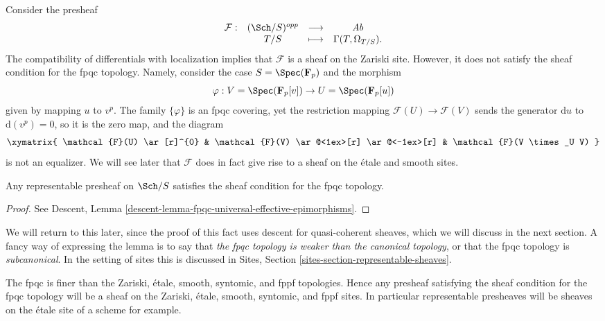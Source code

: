\begin{example}
\label{example-quasi-coherent}
Consider the presheaf
$$
\begin{matrix}
\mathcal{F} : & (\Sch/S)^{opp} & \longrightarrow & \textit{Ab} \\
& T/S & \longmapsto & \Gamma(T, \Omega_{T/S}).
\end{matrix}
$$
The compatibility of differentials with localization implies that
$\mathcal{F}$ is a sheaf on the Zariski site.
However, it does not satisfy the sheaf condition for the fpqc topology.
Namely, consider the case
$S = \Spec(\mathbf{F}_p)$ and the morphism
$$
\varphi :
V = \Spec(\mathbf{F}_p[v])
\to
U = \Spec(\mathbf{F}_p[u])
$$
given by mapping $u$ to $v^p$. The family $\{\varphi\}$ is an fpqc covering,
yet the restriction mapping
$\mathcal{F}(U) \to \mathcal{F}(V)$
sends the generator $\text{d}u$ to $\text{d}(v^p) = 0$, so
it is the zero map, and the diagram
$$
\xymatrix{
\mathcal{F}(U) \ar[r]^{0} &
\mathcal{F}(V) \ar@<1ex>[r] \ar@<-1ex>[r] &
\mathcal{F}(V \times_U V)
}
$$
is not an equalizer. We will see later that $\mathcal{F}$ does in fact
give rise to a sheaf on the \'etale and smooth sites.
\end{example}

\begin{lemma}
\label{lemma-representable-sheaf-fpqc}
Any representable presheaf on $\Sch/S$ satisfies the
sheaf condition for the fpqc topology.
\end{lemma}

\begin{proof}
See
Descent, Lemma \ref{descent-lemma-fpqc-universal-effective-epimorphisms}.
\end{proof}

\noindent
We will return to this later, since the proof of this fact uses
descent for quasi-coherent sheaves, which we will discuss in the next
section. A fancy way of expressing the lemma is to say that
{\it the fpqc topology is weaker than the canonical topology}, or
that the fpqc topology is {\it subcanonical}. In the setting of sites
this is discussed in
Sites, Section \ref{sites-section-representable-sheaves}.

\begin{remark}
\label{remark-fpqc-finest}
The fpqc is finer than the Zariski, \'etale, smooth, syntomic, and fppf
topologies. Hence any presheaf
satisfying the sheaf condition for the fpqc topology will be a
sheaf on the Zariski, \'etale, smooth, syntomic, and fppf
sites. In particular
representable presheaves will be sheaves on the \'etale site of a scheme
for example.
\end{remark}

